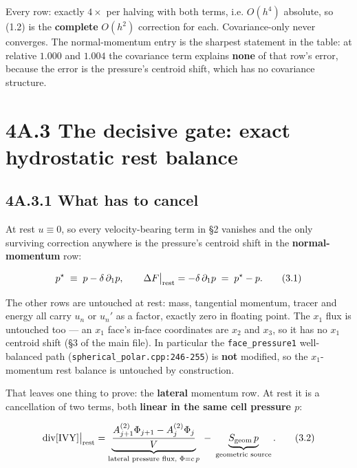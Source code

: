 \documentclass[11pt,a4paper]{article}
\begin{document}
Every row: exactly $4\times$ per halving with both terms, i.e. $O(h^4)$ absolute,
so (1.2) is the \textbf{complete} $O(h^2)$ correction for each. Covariance-only never
converges. The normal-momentum entry is the sharpest statement in the table: at
relative $1.000$ and $1.004$ the covariance term explains \textbf{none} of that row's
error, because the error is the pressure's centroid shift, which has no
covariance structure.

\hrulefill

\section*{4A.3 The decisive gate: exact hydrostatic rest balance}

\subsection*{4A.3.1 What has to cancel}

At rest $u\equiv0$, so every velocity-bearing term in §2 vanishes and the only
surviving correction anywhere is the pressure's centroid shift in the
\textbf{normal-momentum} row:

\begin{equation*}
p^\star \;\equiv\; p-\delta\,\partial_1 p ,
\qquad
\Delta F\big|_{\rm rest}=-\delta\,\partial_1p \;=\; p^\star-p .
\tag{3.1}
\end{equation*}

The other rows are untouched at rest: mass, tangential momentum, tracer and
energy all carry $u_n$ or $u_n'$ as a factor, exactly zero in floating point.
The $x_1$ flux is untouched too — an $x_1$ face's in-face coordinates are $x_2$
and $x_3$, so it has no $x_1$ centroid shift (§3 of the main file). In
particular the \texttt{face\_pressure1} well-balanced path
(\texttt{spherical\_polar.cpp:246-255}) is \textbf{not} modified, so the $x_1$-momentum rest
balance is untouched by construction.

That leaves one thing to prove: the \textbf{lateral} momentum row. At rest it is a
cancellation of two terms, both \textbf{linear in the same cell pressure $p$}:

\begin{equation*}
\mathrm{div}[{\rm IVY}]\big|_{\rm rest}
=\underbrace{\frac{A^{(2)}_{j+1}\Phi_{j+1}-A^{(2)}_j\Phi_j}{V}}_{\text{lateral pressure flux, }\Phi=c\,p}
\;-\;\underbrace{S_{\rm geom}\,p}_{\text{geometric source}} .
\tag{3.2}
\end{equation*}
\end{document}
